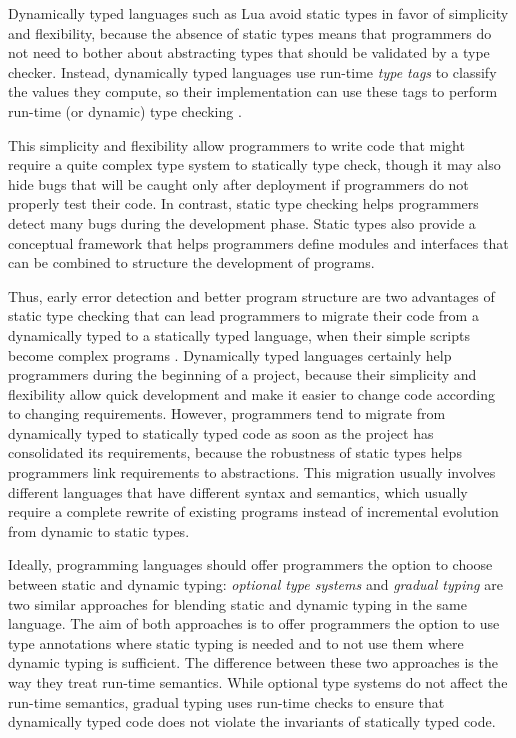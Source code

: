 Dynamically typed languages such as Lua avoid static types in favor of
simplicity and flexibility, because the absence of static types means
that programmers do not need to bother about abstracting types that
should be validated by a type checker.
Instead, dynamically typed languages use run-time \emph{type tags}
to classify the values they compute, so their implementation can use
these tags to perform run-time (or dynamic) type checking
\citep{pierce2002tpl}.

This simplicity and flexibility allow programmers to write code that
might require a quite complex type system to statically type check,
though it may also hide bugs that will be caught only after deployment
if programmers do not properly test their code.
In contrast, static type checking helps programmers detect many
bugs during the development phase.
Static types also provide a conceptual framework that helps
programmers define modules and interfaces that can be combined to
structure the development of programs.

Thus, early error detection and better program structure are two
advantages of static type checking that can lead programmers to
migrate their code from a dynamically typed to a statically
typed language, when their simple scripts become complex programs
\citep{tobin-hochstadt2006ims}.
Dynamically typed languages certainly help programmers during the
beginning of a project, because their simplicity and flexibility
allow quick development and make it easier to change code according to
changing requirements.
However, programmers tend to migrate from dynamically typed to
statically typed code as soon as the project has consolidated its
requirements, because the robustness of static types helps
programmers link requirements to abstractions.
This migration usually involves different languages that have
different syntax and semantics, which usually require a complete
rewrite of existing programs instead of incremental evolution from
dynamic to static types.

Ideally, programming languages should offer programmers the
option to choose between static and dynamic typing:
\emph{optional type systems} \citep{bracha2004pluggable} and
\emph{gradual typing} \citep{siek2006gradual} are two similar
approaches for blending static and dynamic typing in the same
language.
The aim of both approaches is to offer programmers the option
to use type annotations where static typing is needed and to not use
them where dynamic typing is sufficient.
The difference between these two approaches is the way they treat
run-time semantics.
While optional type systems do not affect the run-time semantics,
gradual typing uses run-time checks to ensure that dynamically typed
code does not violate the invariants of statically typed code.

